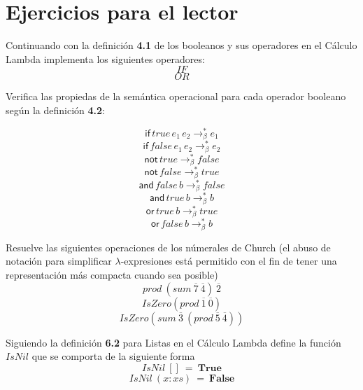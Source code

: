                     \newpage

            \section{Ejercicios para el lector}

                \begin{exercise}
                    Continuando con la definición \textbf{4.1} de los booleanos y sus operadores en el Cálculo Lambda implementa los siguientes operadores:
                    \[IF\]
                    \[OR\]
                \end{exercise}

                \begin{exercise}
                    Verifica las propiedas de la semántica operacional para cada operador booleano según la definición \textbf{4.2}:

                        $$\mathsf{if}\,true\,e_1\,e_2 \to_\beta^* e_1$$ 
                        $$\mathsf{if}\,false\,e_1\,e_2 \to_\beta^* e_2$$ 
                        $$\mathsf{not}\,true\to_\beta^* false$$
                        $$\mathsf{not}\,false\to_\beta^* true$$
                        $$\mathsf{and}\,false\,b\to_\beta^* false$$
                        $$\mathsf{and}\,true\,b\to_\beta^* b$$
                        $$\mathsf{or}\,true\,b\to_\beta^* true$$
                        $$\mathsf{or}\,false\,b\to_\beta^* b$$
                        
                \end{exercise}


                \begin{exercise}
                    Resuelve las siguientes operaciones de los númerales de Church (el abuso de notación para simplificar $\lambda$-expresiones está permitido con el fin de tener una representación más compacta cuando sea posible)
                    \[
                            prod\ (sum\ \overline{7}\ \overline{4})\ \overline{2}
                    \]
                    \[
                            IsZero (prod\ \overline{1}\ \overline{0})
                    \]
                    \[
                            IsZero( sum\ \overline{3}\ (prod\ \overline{5}\ \overline{4}))
                    \]
                \end{exercise}  

                \begin{exercise}
                    Siguiendo la definición \textbf{6.2} para Listas en el Cálculo Lambda define la función $IsNil$ que se comporta de la siguiente forma
                    \[ IsNil\ []\ =\ \textbf{True} \]
                    \[ IsNil\ (x:xs)\  =\ \textbf{False}\]
                \end{exercise}

